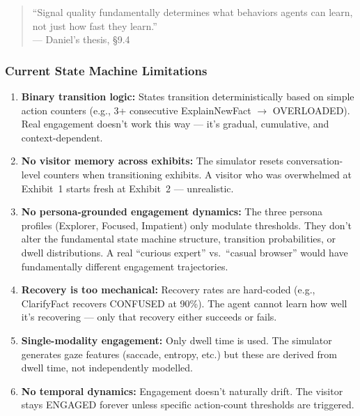 \documentclass[11pt,a4paper]{article}
\begin{document}
\begin{quote}
``Signal quality fundamentally determines what behaviors agents can learn, not just how fast they learn.''\\
--- Daniel's thesis, \S9.4
\end{quote}

\subsubsection{Current State Machine Limitations}

\begin{enumerate}
    \item \textbf{Binary transition logic:} States transition deterministically based on simple action counters (e.g., 3+ consecutive ExplainNewFact $\rightarrow$ OVERLOADED). Real engagement doesn't work this way --- it's gradual, cumulative, and context-dependent.

    \item \textbf{No visitor memory across exhibits:} The simulator resets conversation-level counters when transitioning exhibits. A visitor who was overwhelmed at Exhibit~1 starts fresh at Exhibit~2 --- unrealistic.

    \item \textbf{No persona-grounded engagement dynamics:} The three persona profiles (Explorer, Focused, Impatient) only modulate thresholds. They don't alter the fundamental state machine structure, transition probabilities, or dwell distributions. A real ``curious expert'' vs.\ ``casual browser'' would have fundamentally different engagement trajectories.

    \item \textbf{Recovery is too mechanical:} Recovery rates are hard-coded (e.g., ClarifyFact recovers CONFUSED at 90\%). The agent cannot learn how well it's recovering --- only that recovery either succeeds or fails.

    \item \textbf{Single-modality engagement:} Only dwell time is used. The simulator generates gaze features (saccade, entropy, etc.) but these are derived from dwell time, not independently modelled.

    \item \textbf{No temporal dynamics:} Engagement doesn't naturally drift. The visitor stays ENGAGED forever unless specific action-count thresholds are triggered.
\end{enumerate}
\end{document}
